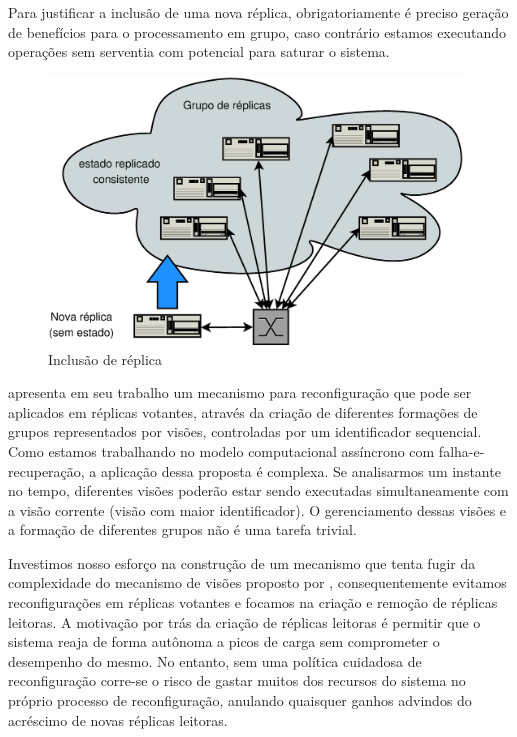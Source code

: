 Para justificar a inclusão de uma nova réplica, obrigatoriamente é preciso geração de
benefícios para o processamento em grupo, caso contrário estamos executando operações sem
serventia com potencial para saturar o sistema.

\begin{figure}[ht]
  \centering
  \includegraphics[width=11cm]{conteudo/capitulos/figuras/inclusao_replica_cluster.eps}
  \caption{Inclusão de réplica}
  \label{fig:inclusao}
\end{figure}

 apresenta em seu trabalho um mecanismo para reconfiguração que pode
ser aplicados em réplicas votantes, através da criação de diferentes formações de grupos
representados por visões, controladas por um identificador sequencial. Como estamos
trabalhando no modelo computacional assíncrono com falha-e-recuperação, a aplicação dessa
proposta é complexa. Se analisarmos um instante no tempo, diferentes visões poderão estar
sendo executadas simultaneamente com a visão corrente (visão com maior identificador). O
gerenciamento dessas visões e a formação de diferentes grupos não é uma tarefa trivial.

Investimos nosso esforço na construção de um mecanismo que tenta fugir da complexidade do
mecanismo de visões proposto por , consequentemente evitamos
reconfigurações em réplicas votantes e focamos na criação e remoção de réplicas leitoras.
A motivação por trás da criação de réplicas leitoras é permitir que o sistema reaja de
forma autônoma a picos de carga sem comprometer o desempenho do mesmo. No entanto, sem uma
política cuidadosa de reconfiguração corre-se o risco de gastar muitos dos recursos do
sistema no próprio processo de reconfiguração, anulando quaisquer ganhos advindos do
acréscimo de novas réplicas leitoras.

